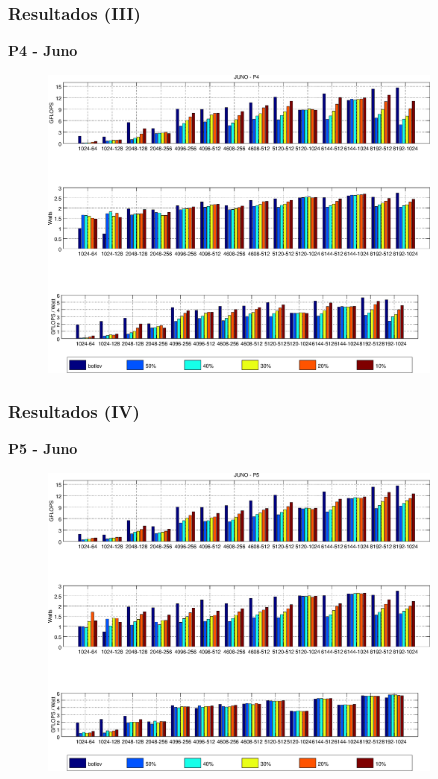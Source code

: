 \documentclass[10pt]{beamer}
\begin{document}
\begin{frame}
  \frametitle{Resultados (III)}
  {\bf P4 - {\sc Juno}}
  \begin{figure}
    \centering
    \includegraphics[width=0.9\textwidth]{Plots/sched_results/P4_juno.eps}
  \end{figure}
\end{frame}

\begin{frame}
  \frametitle{Resultados (IV)}
  {\bf P5 - {\sc Juno}}
  \begin{figure}
    \centering
    \includegraphics[width=0.9\textwidth]{Plots/sched_results/P5_juno.eps}
  \end{figure}
\end{frame}
\end{document}
